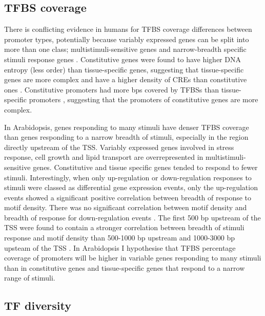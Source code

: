 \documentclass[../main.tex]{subfiles}
\begin{document}
\subsection{TFBS coverage}
\label{chapter1:introduction:tfbs-coverage}

There is conflicting evidence in humans for TFBS coverage differences between promoter types, potentially because variably expressed genes can be split into more than one class; multistimuli-sensitive genes and narrow-breadth specific stimuli response genes \autocite{waltherRegulatoryCodeTranscriptional2007}.
Constitutive genes were found to have higher DNA entropy (less order) than tissue-specific genes, suggesting that tissue-specific genes are more complex and have a higher density of CREs than constitutive ones \autocite{thomasDNAEntropyReveals2015}.
Constitutive promoters had more bps covered by TFBSs than tissue-specific promoters \autocite{mattioliHighthroughputFunctionalAnalysis2019}, suggesting that the promoters of constitutive genes are more complex.

In Arabidopsis, genes responding to many stimuli have denser TFBS coverage than genes responding to a narrow breadth of stimuli, especially in the region directly upstream of the TSS.
Variably expressed genes involved in stress response, cell growth and lipid transport are overrepresented in multistimuli-sensitive genes.
Constitutive and tissue specific genes tended to respond to fewer stimuli.
Interestingly, when only up-regulation or down-regulation responses to stimuli were classed as differential gene expression events, only the up-regulation events showed a significant positive correlation between breadth of response to motif density.
There was no significant correlation between motif density and breadth of response for down-regulation events \autocite{waltherRegulatoryCodeTranscriptional2007}.
The first 500 bp upstream of the TSS were found to contain a stronger correlation between breadth of stimuli response and motif density than 500-1000 bp upstream and 1000-3000 bp upsteam of the TSS \autocite{waltherRegulatoryCodeTranscriptional2007}.
In Arabidopsis I hypothesise that TFBS percentage coverage of promoters will be higher in variable genes responding to many stimuli than in constitutive genes and tissue-specific genes that respond to a narrow range of stimuli.

\subsection{TF diversity}
\label{chapter1:introduction:tf-diversity}
\end{document}
